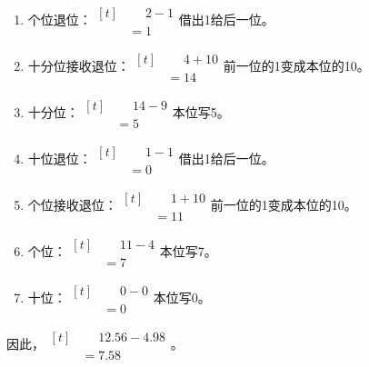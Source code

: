 {\begin{enumerate}[leftmargin=1.7em,itemsep=5pt,topsep=0pt]
\item 个位退位：\(\begin{aligned}[t]&\phantom{={}}2-1\\&=1\end{aligned}\)\quad 借出1给后一位。
\item 十分位接收退位：\(\begin{aligned}[t]&\phantom{={}}4+10\\&=14\end{aligned}\)\quad 前一位的1变成本位的10。
\item 十分位：\(\begin{aligned}[t]&\phantom{={}}14-9\\&=5\end{aligned}\)\quad 本位写5。
\item 十位退位：\(\begin{aligned}[t]&\phantom{={}}1-1\\&=0\end{aligned}\)\quad 借出1给后一位。
\item 个位接收退位：\(\begin{aligned}[t]&\phantom{={}}1+10\\&=11\end{aligned}\)\quad 前一位的1变成本位的10。
\item 个位：\(\begin{aligned}[t]&\phantom{={}}11-4\\&=7\end{aligned}\)\quad 本位写7。
\item 十位：\(\begin{aligned}[t]&\phantom{={}}0-0\\&=0\end{aligned}\)\quad 本位写0。
\end{enumerate}
\par\smallskip
因此，\(\begin{aligned}[t]&\phantom{={}}12.56-4.98\\&=7.58\end{aligned}\)。
\par\medskip

}

